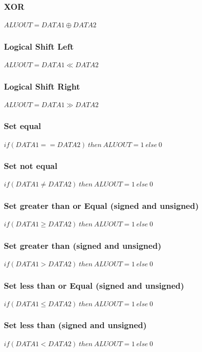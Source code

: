 \subsubsection{XOR}
$ \mathit{ALUOUT} = \mathit{DATA1} \oplus \mathit{DATA2} $

\subsubsection{Logical Shift Left}
$ \mathit{ALUOUT} = \mathit{DATA1} \ll \mathit{DATA2} $

\subsubsection{Logical Shift Right}
$ \mathit{ALUOUT} = \mathit{DATA1} \gg \mathit{DATA2} $

\subsubsection{Set equal}
$ \mathit{if (DATA1 == DATA2) \: then} \: \mathit{ALUOUT} = 1 \: \mathit{else} \: 0 $

\subsubsection{Set not equal}
$ \mathit{if (DATA1 \neq DATA2) \: then} \: \mathit{ALUOUT} = 1 \: \mathit{else} \: 0 $

\subsubsection{Set greater than or Equal (signed and unsigned)}
$ \mathit{if (DATA1 \geq DATA2) \: then} \: \mathit{ALUOUT} = 1 \: \mathit{else} \: 0 $

\subsubsection{Set greater than (signed and unsigned)}
$ \mathit{if (DATA1 > DATA2) \: then} \: \mathit{ALUOUT} = 1 \: \mathit{else} \: 0 $

\subsubsection{Set less than or Equal (signed and unsigned)}
$ \mathit{if (DATA1 \leq DATA2) \: then} \: \mathit{ALUOUT} = 1 \: \mathit{else} \: 0 $

\subsubsection{Set less than (signed and unsigned)}
$ \mathit{if (DATA1 < DATA2) \: then} \: \mathit{ALUOUT} = 1 \: \mathit{else} \: 0 $

